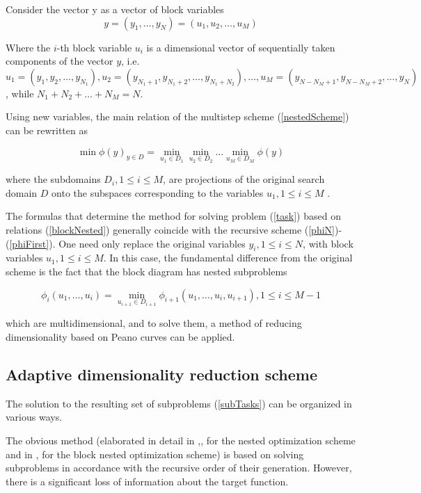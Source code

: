 \documentclass{svproc}
\begin{document}
Consider the vector y as a vector of block variables
\begin{displaymath}
y=(y_1,\dots,y_N)=(u_1,u_2,\dots,u_M)
\end{displaymath}

Where the \(i\)-th block variable \(u_i\) is a dimensional vector   of sequentially taken components of the vector \(y\), i.e. \(u_1=(y_1,y_2,\dots,y_{N_1}),u_2=(y_{N_1+1},y_{N_1+2},\dots,y_{N_1+N_2}),\dots,u_M=(y_{N-N_M+1},y_{N-N_M+2},\dots,y_N)\), while \(N_1+N_2+\dots+N_M=N\).

Using new variables, the main relation of the multistep scheme (\ref{nestedScheme}) can be rewritten as

\begin{equation}
\label{blockNested}
\min\phi(y)_{y\in D}=\min_{u_1\in D_1}\min_{u_2\in D_2}\dots\min_{u_M\in D_M}\phi(y)
\end{equation}

where the subdomains  \(D_i,1\leqslant i\leqslant M\), are projections of the original search domain \(D\) onto the subspaces corresponding to the variables \(u_1,1\leqslant i\leqslant M\) .

The formulas that determine the method for solving problem (\ref{task}) based on relations (\ref{blockNested}) generally coincide with the recursive scheme (\ref{phiN})-(\ref{phiFirst}). One need only replace the original variables  \(y_i,1\leqslant i\leqslant N\), with block variables  \(u_1,1\leqslant i\leqslant M\). 
In this case, the fundamental difference from the original scheme is the fact that the block diagram has nested subproblems

\begin{equation}
\label{subTasks}
\phi_i(u_1,\dots,u_i)=\min_{u_{i+1}\in D_{i+1}}\phi_{i+1}(u_1,\dots,u_i,u_{i+1}),1\leqslant i\leqslant M-1
\end{equation}

which are multidimensional, and to solve them, a method of reducing dimensionality based on Peano curves can be applied.

\subsection{Adaptive dimensionality reduction scheme}

The solution to the resulting set of subproblems (\ref{subTasks}) can be organized in various ways.

The obvious method (elaborated in detail in \cite{Ref23},\cite{Ref24},\cite{Ref25} for the nested optimization scheme and in \cite{Ref26},\cite{Ref27} for the block nested optimization scheme) is based on solving subproblems in accordance with the recursive order of their generation. However, there is a significant loss of information about the target function.
\end{document}
